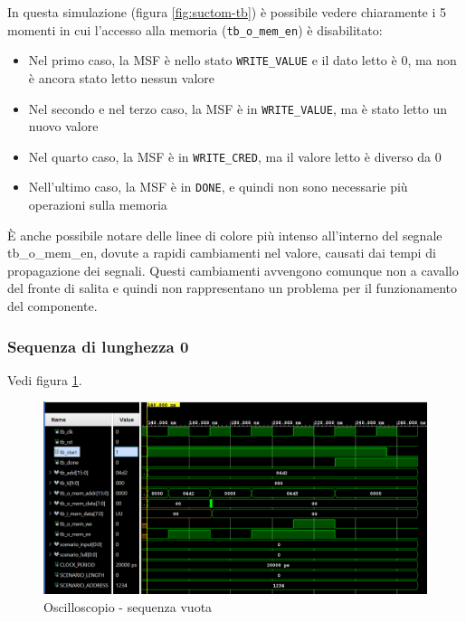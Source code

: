 \documentclass{article}
\begin{document}
In questa simulazione (figura \ref{fig:suctom-tb}) è possibile vedere chiaramente i 5 momenti in cui l'accesso alla memoria (\texttt{tb\_o\_mem\_en}) è disabilitato:
\begin{itemize}
    \item Nel primo caso, la MSF è nello stato \texttt{WRITE\_VALUE} e il dato letto è 0, ma non è ancora stato letto nessun valore
    \item Nel secondo e nel terzo caso, la MSF è in \texttt{WRITE\_VALUE}, ma è stato letto un nuovo valore
    \item Nel quarto caso, la MSF è in \texttt{WRITE\_CRED}, ma il valore letto è diverso da 0
    \item Nell'ultimo caso, la MSF è in \texttt{DONE}, e quindi non sono necessarie più operazioni sulla memoria
\end{itemize}

È anche possibile notare delle linee di colore più intenso all'interno del segnale tb\_o\_mem\_en, dovute a rapidi cambiamenti nel valore, causati dai tempi di propagazione dei segnali. Questi cambiamenti avvengono comunque non a cavallo del fronte di salita e quindi non rappresentano un problema per il funzionamento del componente.

\subsubsection{Sequenza di lunghezza 0}
Vedi figura \ref{fig:empty-tb}.
\begin{figure}[b]
    \centering
    \includegraphics[width=1\linewidth]{tb/empty_tb.png}
    \caption{Oscilloscopio - sequenza vuota}
    \label{fig:empty-tb}
\end{figure}
\end{document}
